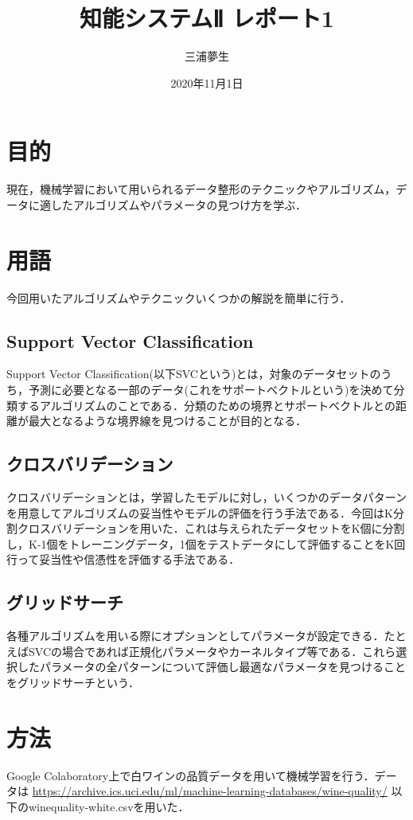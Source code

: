\documentclass[a4paper, titlepage]{jsarticle}
\title{知能システムⅡ レポート1}
\author{三浦夢生}
\date{2020年11月1日}
\begin{document}
	\maketitle

	\section{目的}
	現在，機械学習において用いられるデータ整形のテクニックやアルゴリズム，データに適したアルゴリズムやパラメータの見つけ方を学ぶ．

	\section{用語}
	今回用いたアルゴリズムやテクニックいくつかの解説を簡単に行う．

	\subsection{Support Vector Classification}
	Support Vector Classification(以下SVCという)とは，対象のデータセットのうち，予測に必要となる一部のデータ(これをサポートベクトルという)を決めて分類するアルゴリズムのことである．分類のための境界とサポートベクトルとの距離が最大となるような境界線を見つけることが目的となる．

	\subsection{クロスバリデーション}
	クロスバリデーションとは，学習したモデルに対し，いくつかのデータパターンを用意してアルゴリズムの妥当性やモデルの評価を行う手法である．今回はK分割クロスバリデーションを用いた．これは与えられたデータセットをK個に分割し，K-1個をトレーニングデータ，1個をテストデータにして評価することをK回行って妥当性や信憑性を評価する手法である．

	\subsection{グリッドサーチ}
	各種アルゴリズムを用いる際にオプションとしてパラメータが設定できる．たとえばSVCの場合であれば正規化パラメータやカーネルタイプ等である．これら選択したパラメータの全パターンについて評価し最適なパラメータを見つけることをグリッドサーチという．

	\section{方法}
	Google Colaboratory上で白ワインの品質データを用いて機械学習を行う．データは
	\url{https://archive.ics.uci.edu/ml/machine-learning-databases/wine-quality/}
	以下のwinequality-white.csvを用いた．
\end{document}
